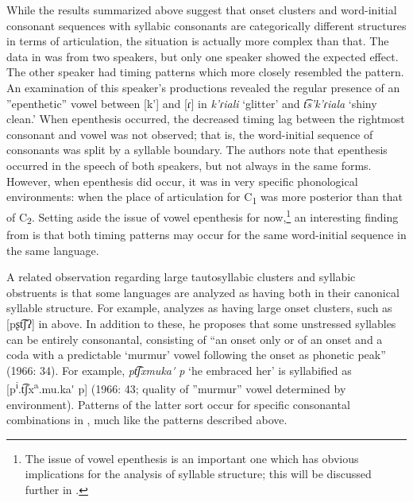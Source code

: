   While the results summarized above suggest that onset clusters and word-initial consonant sequences with syllabic consonants are categorically different structures in terms of articulation, the situation is actually more complex than that. The  data in \citet{GoldsteinEtAl2007} was from two speakers, but only one speaker showed the expected effect. The other speaker had timing patterns which more closely resembled the  pattern. An examination of this speaker’s productions revealed the regular presence of an ”epenthetic” vowel between [k’] and [ɾ] in \textit{k'ɾiali} ‘glitter’ and \textit{t͡s’k’ɾiala} ‘shiny clean.’ When epenthesis occurred, the decreased timing lag between the rightmost consonant and vowel was not observed; that is, the word-initial sequence of consonants was split by a syllable boundary. The authors note that epenthesis occurred in the speech of both  speakers, but not always in the same forms. However, when epenthesis did occur, it was in very specific phonological environments: when the place of articulation for C\textsubscript{1} was more posterior than that of C\textsubscript{2}. Setting aside the issue of vowel epenthesis for now,\footnote{{The issue of vowel epenthesis is an important one which has obvious implications for the analysis of syllable structure; this will be discussed further in .}} an interesting finding from \citet{GoldsteinEtAl2007} is that both timing patterns may occur for the same word-initial sequence in the same language.

  A related observation regarding large tautosyllabic clusters and syllabic obstruents is that some languages are analyzed as having both in their canonical syllable structure. For example, \citet{Crawford1966} analyzes  as having large onset clusters, such as [pʂt͡ʃʔ] in  above. In addition to these, he proposes that some unstressed syllables can be entirely consonantal, consisting of “an onset only or of an onset and a coda with a predictable ‘murmur’ vowel following the onset as phonetic peak” (1966: 34). For example, \textit{pt͡ʃxmuka\'{} p} ‘he embraced her’ is syllabified as [p\textsuperscript{i}.t͡ʃx\textsuperscript{a}.mu.ka\'{} p]
  (1966: 43; quality of ”murmur” vowel determined by environment). Patterns of the latter sort occur for specific consonantal combinations in , much like the  patterns described above. 

